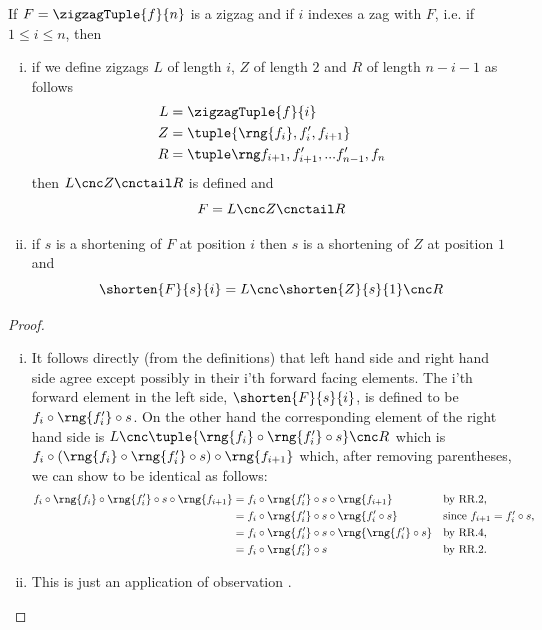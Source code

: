\begin{lemma}
If $F= \zigzagTuple{f}{n}$ is a zigzag and if $i$ indexes a zag
with $F$, i.e. if $1 \leq i \leq n$, then
 
\begin{enumerate}[(i)]
\item if we define zigzags $L$ of length $i$, $Z$ of length $2$ and $R$ of length $n-i-1$ as follows
\begin{align*}
L &= \zigzagTuple{f}{i} \\
Z &= \tuple {\rng{f_i}, f'_i, f_{i+1}} \\
R &= \zigzagIsolationTailTuple{f}{i}{n}
\end{align*}
then $L \cnc Z \cnctail R$ is defined and
\[
F = L \cnc Z \cnctail R
\]
\item if $s$ is a shortening of $F$ at position $i$
then $s$ is a shortening of $Z$ at position $1$ 
and
\[
\shorten{F}{s}{i} = L \cnc \shorten{Z}{s}{1} \cnc R
\]
\end{enumerate}
\end{lemma}
\begin{proof}
\begin{enumerate}[(i)]
\item
It follows directly (from the definitions) that left hand side and right hand side agree except possibly in 
their i'th forward facing elements.
The i'th forward element in the left side, $\shorten{F}{s}{i}$,
is defined to be 
$f_i \circ \rng{f'_i} \circ s$. 
On the other hand the 
corresponding element of the right hand side is
$L \cnc \tuple{\rng{f_i} \circ \rng{f'_i} \circ s} \cnc R$ which
is $f_i \circ (\rng{f_i} \circ \rng{f'_i} \circ s) \circ \rng{f_{i+1}}$
which, after removing parentheses, we can  show to be identical as follows:
\begin{align*}
f_i \circ \rng{f_i} \circ \rng{f'_i} \circ s \circ \rng{f_{i+1}}
&= f_i  \circ \rng{f'_i} \circ s \circ \rng{f_{i+1}} &&\mbox{by RR.2,}\\
&= f_i \circ \rng{f'_i} \circ s \circ \rng{f'_i \circ s} 
           &&\mbox{since $f_{i+1} = f'_i \circ s$,}           \\
&= f_i \circ \rng{f'_i} \circ s \circ \rng{\rng{f'_i} \circ s} 
           &&\mbox{by RR.4,}                                  \\
&= f_i \circ \rng{f'_i} \circ s
           && \mbox{by RR.2.}
\end{align*}
\item %
This is just an application of observation .
\end{enumerate}
\end{proof}

